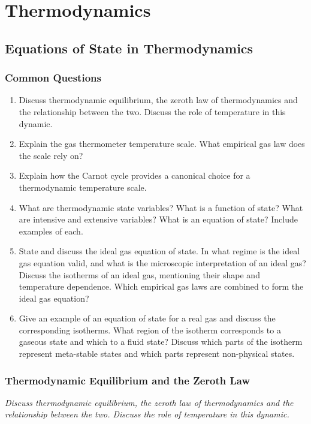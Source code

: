 \documentclass[11pt, a4paper]{article}
\begin{document}
\fi
\newpage

\section{Thermodynamics}

\subsection{Equations of State in Thermodynamics}
\subsubsection{Common Questions}
\begin{enumerate}
    \item Discuss thermodynamic equilibrium, the zeroth law of thermodynamics and the relationship between the two. Discuss the role of temperature in this dynamic. 
    \item Explain the gas thermometer temperature scale. What empirical gas law does the scale rely on?

    \item Explain how the Carnot cycle provides a canonical choice for a thermodynamic temperature scale.

    \item What are thermodynamic state variables? What is a function of state? What are intensive and extensive variables? What is an equation of state? Include examples of each.

    \item State and discuss the ideal gas equation of state. In what regime is the ideal gas equation valid, and what is the microscopic interpretation of an ideal gas? Discuss the isotherms of an ideal gas, mentioning their shape and temperature dependence. Which empirical gas laws are combined to form the ideal gas equation?

    \item Give an example of an equation of state for a real gas and discuss the corresponding isotherms. What region of the isotherm corresponds to a gaseous state and which to a fluid state? Discuss which parts of the isotherm represent meta-stable states and which parts represent non-physical states.
\end{enumerate}

\subsubsection{Thermodynamic Equilibrium and the Zeroth Law}
\textit{Discuss thermodynamic equilibrium, the zeroth law of thermodynamics and the relationship between the two. Discuss the role of temperature in this dynamic.}
\end{document}
